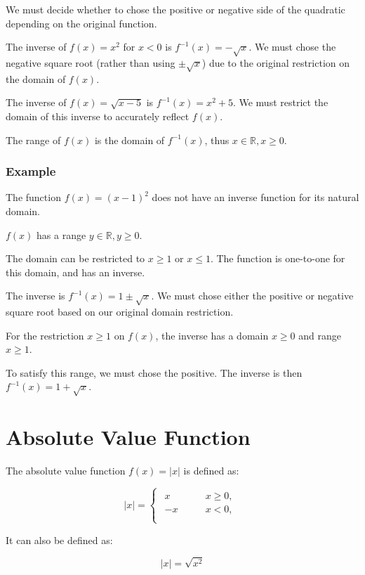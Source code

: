 \documentclass[a4paper,11pt]{report}
\begin{document}
We must decide whether to chose the positive or negative side of the quadratic
depending on the original function.

The inverse of $f(x) = x^2$ for $x < 0$ is $f^{-1}(x) = -\sqrt{x}$. We must
chose the negative square root (rather than using $\pm\sqrt{x}$) due to the
original restriction on the domain of $f(x)$.

The inverse of $f(x) = \sqrt{x - 5}$ is $f^{-1}(x) = x^2 + 5$. We must restrict
the domain of this inverse to accurately reflect $f(x)$.

The range of $f(x)$ is the domain of $f^{-1}(x)$, thus
$x \in \mathbb{R}, x \geq 0$.

\subsubsection{Example}

The function $f(x) = (x - 1)^2$ does not have an inverse function for its
natural domain.

$f(x)$ has a range $y \in \mathbb{R}, y \geq 0$.

The domain can be restricted to $x \geq 1$ or $x \leq 1$. The function is
one-to-one for this domain, and has an inverse.

The inverse is $f^{-1}(x) = 1 \pm \sqrt{x}$. We must chose either the positive
or negative square root based on our original domain restriction.

For the restriction $x \geq 1$ on $f(x)$, the inverse has a domain $x \geq 0$
and range $x \geq 1$.

To satisfy this range, we must chose the positive. The inverse is then
$f^{-1}(x) = 1 + \sqrt{x}$.


\section{Absolute Value Function}

The absolute value function $f(x) = \lvert x \rvert$ is defined as:

$$
\lvert x \rvert = \begin{cases}
\begin{aligned}
	x \qquad & x \geq 0, \\
	-x \qquad & x < 0, \\
\end{aligned}
\end{cases}
$$

It can also be defined as:

$$
\lvert x \rvert = \sqrt{x^2}
$$
\end{document}
